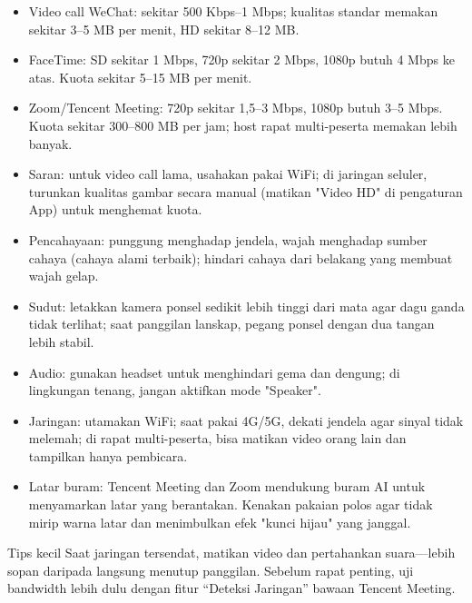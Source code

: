 
\begin{itemize}
  \item Video call WeChat: sekitar 500 Kbps–1 Mbps; kualitas standar memakan sekitar 3–5 MB per menit, HD sekitar 8–12 MB.
  \item FaceTime: SD sekitar 1 Mbps, 720p sekitar 2 Mbps, 1080p butuh 4 Mbps ke atas. Kuota sekitar 5–15 MB per menit.
  \item Zoom/Tencent Meeting: 720p sekitar 1,5–3 Mbps, 1080p butuh 3–5 Mbps. Kuota sekitar 300–800 MB per jam; host rapat multi-peserta memakan lebih banyak.
  \item Saran: untuk video call lama, usahakan pakai WiFi; di jaringan seluler, turunkan kualitas gambar secara manual (matikan "Video HD" di pengaturan App) untuk menghemat kuota.
\end{itemize}


\begin{itemize}
  \item Pencahayaan: punggung menghadap jendela, wajah menghadap sumber cahaya (cahaya alami terbaik); hindari cahaya dari belakang yang membuat wajah gelap.
  \item Sudut: letakkan kamera ponsel sedikit lebih tinggi dari mata agar dagu ganda tidak terlihat; saat panggilan lanskap, pegang ponsel dengan dua tangan lebih stabil.
  \item Audio: gunakan headset untuk menghindari gema dan dengung; di lingkungan tenang, jangan aktifkan mode "Speaker".
  \item Jaringan: utamakan WiFi; saat pakai 4G/5G, dekati jendela agar sinyal tidak melemah; di rapat multi-peserta, bisa matikan video orang lain dan tampilkan hanya pembicara.
  \item Latar buram: Tencent Meeting dan Zoom mendukung buram AI untuk menyamarkan latar yang berantakan. Kenakan pakaian polos agar tidak mirip warna latar dan menimbulkan efek "kunci hijau" yang janggal.
\end{itemize}

\begin{tcbinfo}{Tips kecil}
Saat jaringan tersendat, matikan video dan pertahankan suara—lebih sopan daripada langsung menutup panggilan. Sebelum rapat penting, uji bandwidth lebih dulu dengan fitur “Deteksi Jaringan” bawaan Tencent Meeting.

\end{tcbinfo}


